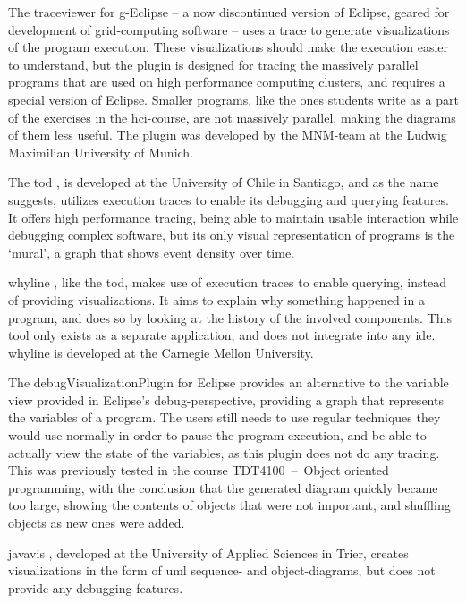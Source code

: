 The \gls{traceviewer} \cite{Thomas2010} for g-Eclipse -- a now discontinued version of Eclipse, geared for development of grid-computing software -- uses a trace to generate visualizations of the program execution.
These visualizations should make the execution easier to understand, but the plugin is designed for tracing the massively parallel programs that are used on high performance computing clusters, and requires a special version of Eclipse.
Smaller programs, like the ones students write as a part of the exercises in the \gls{hci}-course, are not massively parallel, making the diagrams of them less useful.
The plugin was developed by the MNM-team at the Ludwig Maximilian University of Munich.

The \gls{tod} \cite{Pothier2007}, is developed at the University of Chile in Santiago, and as the name suggests, utilizes execution traces to enable its debugging and querying features.
It offers high performance tracing, being able to maintain usable interaction while debugging complex software, but its only visual representation of programs is the `mural', a graph that shows event density over time.

\Gls{whyline} \cite{ko2009}, like the \gls{tod}, makes use of execution traces to enable querying, instead of providing visualizations.
It aims to explain why something happened in a program, and does so by looking at the history of the involved components.
This tool only exists as a separate application, and does not integrate into any \gls{ide}.
\Gls{whyline} is developed at the Carnegie Mellon University.

The \gls{debugVisualizationPlugin} for Eclipse provides an alternative to the variable view provided in Eclipse's debug-perspective, providing a graph that represents the variables of a program.
The users still needs to use regular techniques they would use normally in order to pause the program-execution, and be able to actually view the state of the variables, as this plugin does not do any tracing.
This was previously tested in the course TDT4100~--~Object oriented programming, with the conclusion that the generated diagram quickly became too large, showing the contents of objects that were not important, and shuffling objects as new ones were added.%

\Gls{javavis} \cite{Oechsle2002}, developed at the University of Applied Sciences in Trier, creates visualizations in the form of \gls{uml} sequence- and object-diagrams, but does not provide any debugging features.

